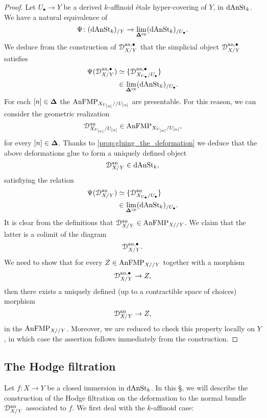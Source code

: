 \documentclass[10pt,a4paper,reqno]{amsart} %
\theoremstyle{plain}
\theoremstyle{definition}
\theoremstyle{remark}
\numberwithin{equation}{section}
\begin{document}
\begin{proof} Let $U_\bullet \to Y$ be a derived $k$-affinoid \'etale hyper-covering of $Y$, in $\mathrm{dAnSt}_k$. We have a natural equivalence of \infcats
        \[
            \Psi \colon (\mathrm{dAnSt}_k)_{/ Y}  \to \lim_{\bm{\Delta} ^\mathrm{op}} (\mathrm{dAnSt}_k)_{/U_\bullet}.
        \]
    We deduce from the construction of $\mathcal D^{\mathrm{an}, \bullet}_{X/ Y}$ that the simplicial object $\mathcal D^{\mathrm{an}, \bullet}_{X/ Y}$ satisfies
        \begin{align*}
            \Psi(\mathcal D^{\mathrm{an}, \bullet}_{X/ Y}) & \simeq \{ \mathcal D^{\mathrm{an}, \bullet}_{X_{U_\bullet}/ U_\bullet} \} \\
                                                    & \in \lim_{\bm{\Delta} ^\mathrm{op}} (\mathrm{dAnSt}_k)_{/ U_\bullet}.
        \end{align*}
    For each $[n] \in \bm{\Delta}$ the \infcats $\mathrm{AnFMP}_{X_{U_{[n]}}/ /U_{[n]}}$ are presentable. For this reason, we can consider the geometric realization
        \[
            \mathcal D_{X_{U_{[n]}}/ U_{[n]}} ^\mathrm{an} \in \mathrm{AnFMP}_{X_{U_{[n]}} / U_{[n]}},
        \]
    for every $[n] \in \bm{\Delta}$. Thanks to
    \cref{prop:gluing_the_deformation} we deduce that the above deformations glue to form a uniquely defined object
        \[
            \mathcal D^\mathrm{an}_{X/ Y} \in \mathrm{dAnSt}_k,  
        \]
    satisfiying the relation 
        \begin{align*}
            \Psi(\mathcal D^\mathrm{an}_{X/ Y}) & \simeq \{ \mathcal D^\mathrm{an}_{X_{U_\bullet}/ U_\bullet} \} \\
                                & \in \lim_{\bm{\Delta} ^\mathrm{op}} (\mathrm{dAnSt}_k)_{/ U_\bullet}.
        \end{align*}
    It is clear from the definitions that $\mathcal D^\mathrm{an}_{X/ Y} \in \mathrm{AnFMP}_{X/ /Y}$. We claim that the latter is a colimit of the diagram
        \[  
            \mathcal D^{\mathrm{an}, \bullet}_{X/ Y}.
        \]
    We need to show that for every $Z \in \mathrm{AnFMP}_{X/ /Y}$ together with a morphism
        \[
            \mathcal D^{\mathrm{an}, \bullet}_{X/ Y} \to Z,   
        \]
    then there exists a uniquely defined (up to a contractible space of choices) morphism
        \[
            \mathcal D^\mathrm{an}_{X/ Y} \to Z,  
        \]
    in the \infcat $\mathrm{AnFMP}_{X/ /Y}$. Moreover, we are reduced to check this property locally on $Y$, in which case the assertion follows immediately
    from the construction.
\end{proof}


\subsection{The Hodge filtration} Let $f \colon X \to Y$ be a closed immersion in $\mathrm{dAnSt}_k$.
In this \S, we will describe the construction of the Hodge filtration on the deformation to the normal bundle $\mathcal D_{X/ Y}^\mathrm{an}$ associated to $f$.
We first deal with the $k$-affinoid case:
\end{document}
